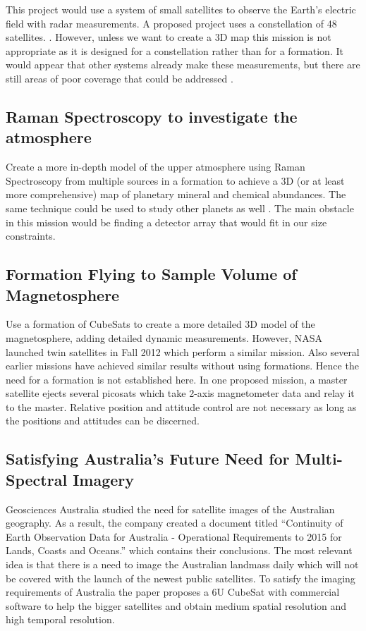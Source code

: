 This project would use a system of small satellites to observe the Earth's electric field with radar measurements. A proposed project uses a constellation of 48 satellites. \cite{Ref:Redd}. However, unless we want to create a 3D map this mission is not appropriate as it is designed for a constellation rather than for a formation. It would appear that other systems already make these measurements, but there are still areas of poor coverage that could be addressed \cite{Ref:ElecMap}. 

\subsection{Raman Spectroscopy to investigate the atmosphere}

Create a more in-depth model of the upper atmosphere using Raman Spectroscopy from multiple sources in a formation to achieve a 3D (or at least more comprehensive) map of planetary mineral and chemical abundances. The same technique could be used to study other planets as well \cite{Ref:Cantrell}. The main obstacle in this mission would be finding a detector array that would fit in our size constraints. 

\subsection{Formation Flying to Sample Volume of Magnetosphere}

Use a formation of CubeSats to create a more detailed 3D model of the magnetosphere, adding detailed dynamic measurements. However, NASA launched twin satellites in Fall 2012 which perform a similar mission. Also several earlier missions have achieved similar results without using formations\cite{Ref:Mag3D}. Hence the need for a formation is not established here. In one proposed mission, a master satellite ejects several picosats which take 2-axis magnetometer data and relay it to the master. Relative position and attitude control are not necessary as long as the positions and attitudes can be discerned.\cite{Ref:Clarke}

\subsection{Satisfying Australia's Future Need for Multi-Spectral Imagery}

Geosciences Australia studied the need for satellite images of the Australian geography. As a result, the company created a document titled ``Continuity of Earth Observation Data for Australia - Operational Requirements to 2015 for Lands, Coasts and Oceans.'' which contains their conclusions. The most relevant idea is that there is a need to image the Australian landmass daily which will not be covered with the launch of the newest public satellites. To satisfy the imaging requirements of Australia the paper proposes a 6U CubeSat with commercial software to help the bigger satellites and obtain medium spatial resolution and high temporal resolution. \cite{Stepan_ConstellationImagery}

